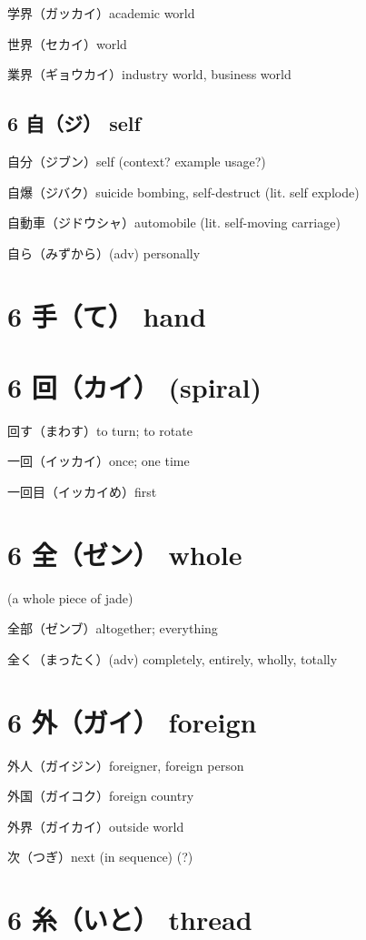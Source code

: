 学界（ガッカイ）academic world

世界（セカイ）world

業界（ギョウカイ）industry world, business world

\subsection{6 自（ジ） self}

自分（ジブン）self (context? example usage?)

自爆（ジバク）suicide bombing, self-destruct (lit. self explode)

自動車（ジドウシャ）automobile (lit. self-moving carriage)

自ら（みずから）(adv) personally

\section{6 手（て） hand}

\section{6 回（カイ） (spiral)}

回す（まわす）to turn; to rotate

一回（イッカイ）once; one time

一回目（イッカイめ）first

\section{6 全（ゼン） whole}

(a whole piece of jade)

全部（ゼンブ）altogether; everything

全く（まったく）(adv) completely, entirely, wholly, totally

\section{6 外（ガイ） foreign}

外人（ガイジン）foreigner, foreign person

外国（ガイコク）foreign country

外界（ガイカイ）outside world

次（つぎ）next (in sequence) (?)

\section{6 糸（いと） thread}


